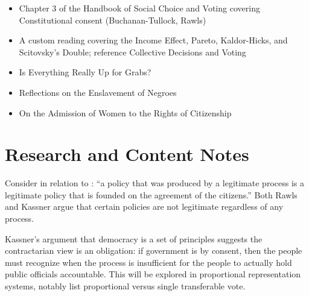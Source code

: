 \begin{itemize}
    \item Chapter 3 of the Handbook of Social Choice and Voting \autocite[35-51]{Heckelman2015} covering Constitutional consent (Buchanan-Tullock, Rawls)

    \item A custom reading covering the Income Effect, Pareto, Kaldor-Hicks, and Scitovsky's Double; reference Collective Decisions and Voting \autocite[23-32]{Tideman2006}

    \item Is Everything Really Up for Grabs? \autocite{Kassner2006}

    \item Reflections on the Enslavement of Negroes \autocite{Condorcet1781}

    \item On the Admission of Women to the Rights of Citizenship \autocite{Condorcet1789}
\end{itemize}

\section{Research and Content Notes}

Consider \autocite{Kassner2006} in relation to \autocite[45]{Heckelman2015}: ``a policy that was produced by a legitimate process is a legitimate policy that is founded on the agreement of the citizens.''  Both Rawls and Kassner argue that certain policies are not legitimate regardless of any process.

Kassner's argument that democracy is a set of principles suggests the contractarian view is an obligation:  if government is by consent, then the people must recognize when the process is insufficient for the people to actually hold public officials accountable.  This will be explored in proportional representation systems, notably list proportional versus single transferable vote.

